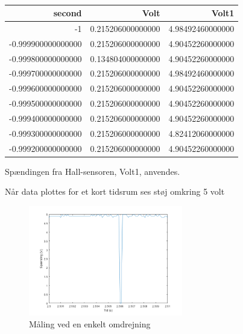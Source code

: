 \begin{table}[h]
  \centering
\begin{tabular}{r|r|r}
\hline
\textbf{second} & \textbf{Volt} & \textbf{Volt1} \\
\hline
-1 & 0.215206000000000 & 4.98492460000000 \\
-0.999900000000000 & 0.215206000000000 & 4.90452260000000 \\
-0.999800000000000 & 0.134804000000000 & 4.90452260000000 \\
-0.999700000000000 & 0.215206000000000 & 4.98492460000000 \\
-0.999600000000000 & 0.215206000000000 & 4.90452260000000 \\
-0.999500000000000 & 0.215206000000000 & 4.90452260000000 \\
-0.999400000000000 & 0.215206000000000 & 4.90452260000000 \\
-0.999300000000000 & 0.215206000000000 & 4.82412060000000 \\
-0.999200000000000 & 0.215206000000000 & 4.90452260000000 \\
\hline
\end{tabular}
  \caption{}
  \label{tab:komp3}
\end{table}

Spændingen fra Hall-sensoren, Volt1, anvendes.

Når data plottes for et kort tidsrum ses støj omkring 5 volt
\clearpage
\begin{figure}[h]
  \centering
  \includegraphics[width=0.6\textwidth]{./figurer/mo1.png}
  \caption{Måling ved en enkelt omdrejning}
  \label{fig:mo1}
\end{figure}

